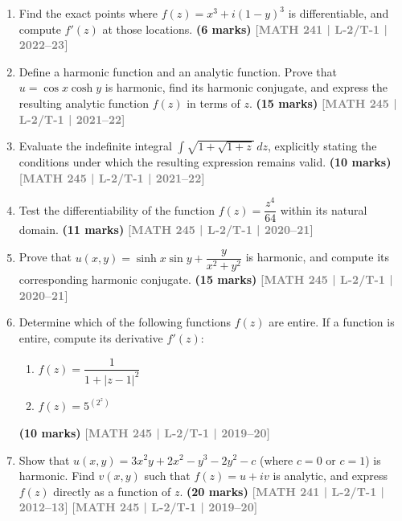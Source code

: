 \documentclass[12pt]{article}
\newcommand{\yr}[1]{\hfill\textcolor{gray}{\small\textbf{[#1]}}}
\newcommand{\mk}[1]{\textcolor{orange!70!black}{\small\textbf{(#1 marks)}}}
\begin{document}
\begin{enumerate}
\item Find the exact points where $f(z)=x^{3}+i(1-y)^{3}$ is differentiable, and compute $f'(z)$ at those locations.
\mk{6} \yr{MATH 241 | L-2/T-1 | 2022--23}









\item Define a harmonic function and an analytic function. Prove that $u=\cos x\cosh y$ is harmonic, find its harmonic conjugate, and express the resulting analytic function $f(z)$ in terms of $z$.
\mk{15} \yr{MATH 245 | L-2/T-1 | 2021--22}




\item Evaluate the indefinite integral $\displaystyle\int\sqrt{1+\sqrt{1+z}}\,dz$, explicitly stating the conditions under which the resulting expression remains valid.
\mk{10} \yr{MATH 245 | L-2/T-1 | 2021--22}





\item Test the differentiability of the function $f(z)=\dfrac{z^{4}}{64}$ within its natural domain.
\mk{11} \yr{MATH 245 | L-2/T-1 | 2020--21}




\item Prove that $u(x,y)=\sinh x\sin y+\dfrac{y}{x^{2}+y^{2}}$ is harmonic, and compute its corresponding harmonic conjugate.
\mk{15} \yr{MATH 245 | L-2/T-1 | 2020--21}







\item Determine which of the following functions $f(z)$ are entire. If a function is entire, compute its derivative $f'(z)$:
\begin{enumerate}
  \item $f(z)=\dfrac{1}{1+|z-1|^{2}}$
  \item $f(z)=5^{(2^{z})}$
\end{enumerate}
\mk{10} \yr{MATH 245 | L-2/T-1 | 2019--20}





\item Show that $u(x,y)=3x^{2}y+2x^{2}-y^{3}-2y^{2}-c$ (where $c=0$ or $c=1$) is harmonic. Find $v(x,y)$ such that $f(z)=u+iv$ is analytic, and express $f(z)$ directly as a function of $z$.
\mk{20} \yr{MATH 241 | L-2/T-1 | 2012--13} \yr{MATH 245 | L-2/T-1 | 2019--20}





\end{enumerate}
\end{document}
